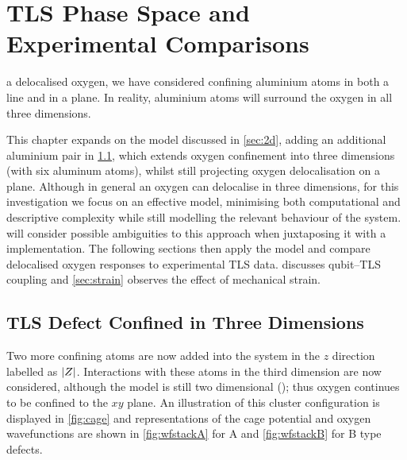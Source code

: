 \versoimage
\chapter[TLS Phase Space]{TLS Phase Space and Experimental Comparisons}\label{ch:tlsphase}

 a delocalised oxygen, we have considered confining aluminium atoms in both a line and in a plane.
In reality, aluminium atoms will surround the oxygen in all three dimensions.

This chapter expands on the  model discussed in \cref{sec:2d}, adding an additional aluminium pair in \cref{sec:tls}, which extends oxygen confinement into three dimensions (with six aluminum atoms), whilst still projecting oxygen delocalisation on a plane.
Although in general an oxygen can delocalise in three dimensions, for this investigation we focus on an effective  model, minimising both computational and descriptive complexity while still modelling the relevant behaviour of the system.
 will consider possible ambiguities to this approach when juxtaposing it with a  implementation.
The following sections then apply the  model and compare delocalised oxygen responses to experimental TLS data.
 discusses qubit--TLS coupling and \cref{sec:strain} observes the effect of mechanical strain.

\section{TLS Defect Confined in Three Dimensions}\label{sec:tls}

Two more confining atoms are now added into the system in the $z$ direction labelled as $\lvert Z\rvert$.
Interactions with these atoms in the third dimension are now considered, although the model is still two dimensional (\ie {}); thus oxygen continues to be confined to the $xy$ plane.
An illustration of this cluster configuration is displayed in \cref{fig:cage} and representations of the cage potential and oxygen wavefunctions are shown in \cref{fig:wfstackA} for A and \cref{fig:wfstackB} for B type defects.

